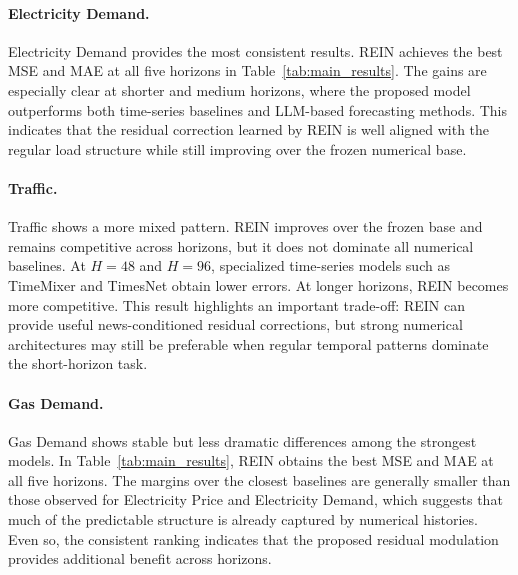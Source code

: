 \documentclass{article}
\newcommand{\method}{REIN\xspace}
\begin{document}
\paragraph{Electricity Demand.}
Electricity Demand provides the most consistent results. \method achieves the best MSE and MAE at all five horizons in Table~\ref{tab:main_results}. The gains are especially clear at shorter and medium horizons, where the proposed model outperforms both time-series baselines and LLM-based forecasting methods. This indicates that the residual correction learned by \method is well aligned with the regular load structure while still improving over the frozen numerical base.

\paragraph{Traffic.}
Traffic shows a more mixed pattern. \method improves over the frozen base and remains competitive across horizons, but it does not dominate all numerical baselines. At $H{=}48$ and $H{=}96$, specialized time-series models such as TimeMixer and TimesNet obtain lower errors. At longer horizons, \method becomes more competitive. This result highlights an important trade-off: REIN can provide useful news-conditioned residual corrections, but strong numerical architectures may still be preferable when regular temporal patterns dominate the short-horizon task.

\paragraph{Gas Demand.}
Gas Demand shows stable but less dramatic differences among the strongest models. In Table~\ref{tab:main_results}, \method obtains the best MSE and MAE at all five horizons. The margins over the closest baselines are generally smaller than those observed for Electricity Price and Electricity Demand, which suggests that much of the predictable structure is already captured by numerical histories. Even so, the consistent ranking indicates that the proposed residual modulation provides additional benefit across horizons.

\end{document}
